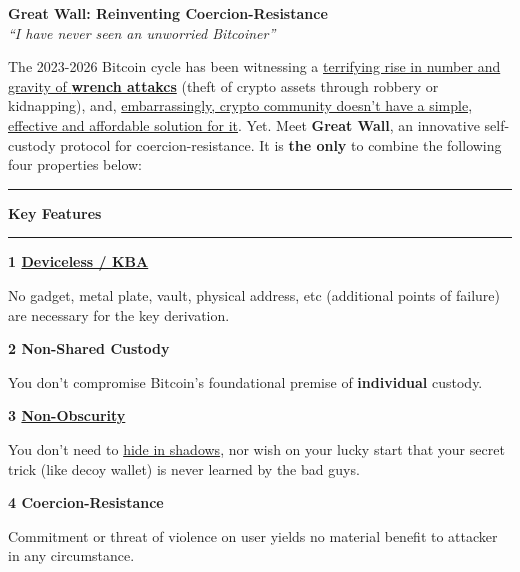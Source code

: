 \documentclass[8pt]{article}
\newcommand{\feature}[2]{
    \noindent\textbf{\large #1}\par
    \vspace{2pt}
    #2
    \vspace{11pt}
}
\begin{document}
\pagestyle{empty}  %
\begin{center}
    \vspace*{-1cm}
    {\huge\bfseries\color{accent} Great Wall: Reinventing Coercion-Resistance}\\[1ex]
    {\large\textit{``I have never seen an unworried Bitcoiner''}}
    \vspace{0.3cm}
\end{center}

\noindent
The 2023-2026 Bitcoin cycle has been witnessing a \href{https://x.com/search?q=jameson\%20lopp\%20wrench\%20attack&src=typed_query&f=live}{terrifying rise in number and gravity of \textbf{wrench attakcs}} (theft of crypto assets through robbery or kidnapping), and, \href{https://www.youtube.com/watch?v=MsfR6ZIkzPs&t=2734s}{embarrassingly, crypto community doesn't have a simple, effective and affordable solution for it}. Yet. Meet \textbf{Great Wall}, an innovative self-custody protocol for coercion-resistance. It is \textbf{the only} to combine the following four properties below: 


\vspace{0.3cm}

{\color{accent}\hrule}
\vspace{0.2cm}
{\Large\textbf{Key Features}}
\vspace{0.2cm}
{\color{accent}\hrule}
\vspace{0.3cm}

\begin{multicols}{2}
    \feature{1 \href{https://en.wikipedia.org/wiki/Knowledge-based_authentication}{Deviceless / KBA}}{
        No gadget, metal plate, vault, physical address, etc (additional points of failure) are necessary for the key derivation. 
    }

    \feature{2 Non-Shared Custody}{
        You don't compromise Bitcoin's foundational premise of \textbf{individual} custody.
    }

    \feature{3 \href{https://en.wikipedia.org/wiki/Kerckhoffs's_principle}{Non-Obscurity}}{
        You don't need to \href{https://www.linkedin.com/posts/lugano-plan-b_luganoplanb-bitcoin-activity-7167881837728493568-LEZk/}{hide in shadows}, nor wish on your lucky start that your secret trick (like decoy wallet) is never learned by the bad guys.
    }

    \feature{4 Coercion-Resistance}{
        Commitment or threat of violence on user yields no material benefit to attacker in any circumstance.
    }
\end{multicols}
\end{document}
